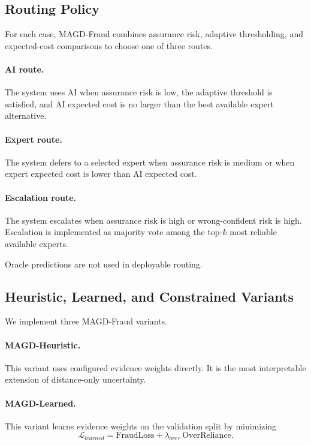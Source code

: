 \subsection{Routing Policy}
\label{subsec:routing_policy}

For each case, MAGD-Fraud combines assurance risk, adaptive thresholding, and expected-cost comparisons to choose one of three routes.

\paragraph{AI route.}
The system uses AI when assurance risk is low, the adaptive threshold is satisfied, and AI expected cost is no larger than the best available expert alternative.

\paragraph{Expert route.}
The system defers to a selected expert when assurance risk is medium or when expert expected cost is lower than AI expected cost.

\paragraph{Escalation route.}
The system escalates when assurance risk is high or wrong-confident risk is high. Escalation is implemented as majority vote among the top-$k$ most reliable available experts.

Oracle predictions are not used in deployable routing.

\subsection{Heuristic, Learned, and Constrained Variants}
\label{subsec:policy_variants}

We implement three MAGD-Fraud variants.

\paragraph{MAGD-Heuristic.}
This variant uses configured evidence weights directly. It is the most interpretable extension of distance-only uncertainty.

\paragraph{MAGD-Learned.}
This variant learns evidence weights on the validation split by minimizing
\begin{equation}
\mathcal{L}_{learned} =
\text{FraudLoss}
+ \lambda_{over}\,\text{OverReliance}.
\end{equation}

